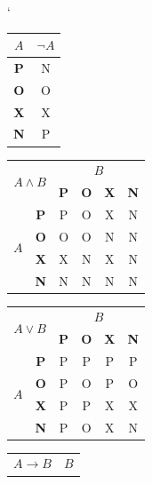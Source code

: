 \documentclass[a4paper, 11pt]{article}
\begin{document}
  \begin{table}[h]
    \centering
    \catcode`
    \begin{tabular}{|c|c|}
      \hline
      $A$ & $\neg A$ \\
      \hline
      \textbf{P} & N \\
      \hline
      \textbf{O} & O \\
      \hline
      \textbf{X} & X \\
      \hline
      \textbf{N} & P \\
      \hline
    \end{tabular}
    \begin{tabular}{|c|c|c|c|c|c|}
      \hline
      \multicolumn{2}{|c|}{\multirow{2}{*}{$A \wedge B$}} & \multicolumn{4}{c|}{$B$} \\
        \cline{3-6}
      \multicolumn{2}{|c|}{} & \textbf{P} & \textbf{O} & \textbf{X} & \textbf{N} \\
      \hline
      \multirow{4}{*}{$A$} & \textbf{P} & P & O & X & N \\ \cline{2-6}
                           & \textbf{O} & O & O & N & N \\ \cline{2-6}
                           & \textbf{X} & X & N & X & N \\ \cline{2-6}
                           & \textbf{N} & N & N & N & N \\ \cline{2-6}
      \hline
    \end{tabular}
    \begin{tabular}{|c|c|c|c|c|c|}
      \hline
      \multicolumn{2}{|c|}{\multirow{2}{*}{$A \vee B$}} & \multicolumn{4}{c|}{$B$} \\
      \cline{3-6}
      \multicolumn{2}{|c|}{} & \textbf{P} & \textbf{O} & \textbf{X} & \textbf{N} \\
      \hline
      \multirow{4}{*}{$A$} & \textbf{P} & P & P & P & P \\ \cline{2-6}
                           & \textbf{O} & P & O & P & O \\ \cline{2-6}
                           & \textbf{X} & P & P & X & X \\ \cline{2-6}
                           & \textbf{N} & P & O & X & N \\ \cline{2-6}
      \hline
    \end{tabular}
    \begin{tabular}{|c|c|c|c|c|c|}
      \hline
      \multicolumn{2}{|c|}{\multirow{2}{*}{$A \rightarrow B$}} & \multicolumn{4}{c|}{$B$} \\

\end{tabular}
\end{table}
\end{document}
